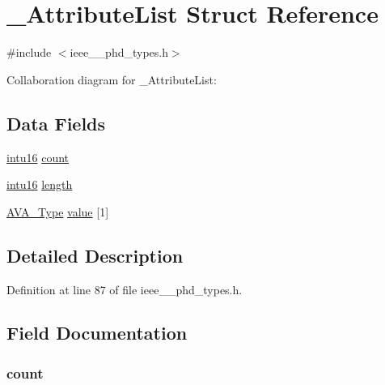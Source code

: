 \hypertarget{struct___attribute_list}{}\section{\+\_\+\+Attribute\+List Struct Reference}
\label{struct___attribute_list}


{\ttfamily \#include $<$ieee\+\_\+\_\+phd\+\_\+types.\+h$>$}



Collaboration diagram for \+\_\+\+Attribute\+List\+:
\subsection*{Data Fields}
\begin{DoxyCompactItemize}
\item 
\hyperlink{ieee__11073__phd__types_8h_a3561595d2aa7416532e1c9910abd076d}{intu16} \hyperlink{struct___attribute_list_abf6db060ae8e224764b0f867fb135ecd}{count}
\item 
\hyperlink{ieee__11073__phd__types_8h_a3561595d2aa7416532e1c9910abd076d}{intu16} \hyperlink{struct___attribute_list_a3743679e4ff85e3e1b3fc2e59973fbb3}{length}
\item 
\hyperlink{ieee__11073__phd__types_8h_aafe814221abf9b10555527f0fdee0ef9}{A\+V\+A\+\_\+\+Type} \hyperlink{struct___attribute_list_ac820964129e6a9908a0bca883f165d83}{value} \mbox{[}1\mbox{]}
\end{DoxyCompactItemize}


\subsection{Detailed Description}


Definition at line 87 of file ieee\+\_\+\_\+phd\+\_\+types.\+h.



\subsection{Field Documentation}
\hypertarget{struct___attribute_list_abf6db060ae8e224764b0f867fb135ecd}{}
\subsubsection[{count}]{ count}\label{struct___attribute_list_abf6db060ae8e224764b0f867fb135ecd}


